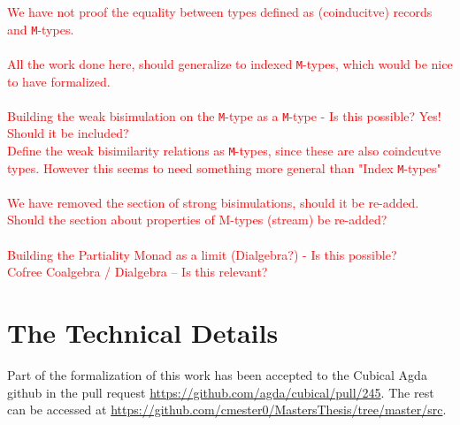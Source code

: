 \documentclass[twoside,11pt,openright]{report}
\theoremstyle{plain} %
\theoremstyle{definition}
\theoremstyle{remark}
\begin{document}
\textcolor{red}{
We have not proof the equality between types defined as (coinducitve) records and \texttt{M}-types.
\\ \\
All the work done here, should generalize to indexed \texttt{M}-types, which would be nice to have formalized.
\\ \\
Building the weak bisimulation on the \texttt{M}-type as a \texttt{M}-type - Is this possible? Yes! Should it be included?
\\
Define the weak bisimilarity relations as \texttt{M}-types, since these are also coindcutve types. However this seems to need something more general than "Index \texttt{M}-types"
\\ \\
We have removed the section of strong bisimulations, should it be re-added. Should the section about properties of M-types (stream) be re-added?
\\ \\
Building the Partiality Monad as a limit (Dialgebra?) - Is this possible?
\\
Cofree Coalgebra / Dialgebra -- Is this relevant? 
}


\cleardoublepage
{}
 



\cleardoublepage
\appendix

\chapter{The Technical Details}
Part of the formalization of this work has been accepted to the Cubical Agda github in the pull request \url{https://github.com/agda/cubical/pull/245}. The rest can be accessed at \url{https://github.com/cmester0/MastersThesis/tree/master/src}. 
\end{document}
